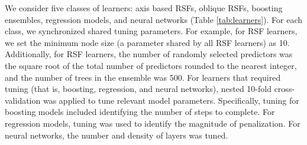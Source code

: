 \documentclass[twoside,11pt]{article}\usepackage[]{graphicx}\usepackage[]{xcolor}
\newcommand{\ie}{that is}
\newcommand{\tabref}[1]{Table \ref{#1}}
\begin{document}
We consider five classes of learners: axis based RSFs, oblique RSFs, boosting ensembles, regression models, and neural networks (\tabref{tab:learners}). For each class, we synchronized shared tuning parameters. For example, for RSF learners, we set the minimum node size (a parameter shared by all RSF learners) as 10. Additionally, for RSF learners, the number of randomly selected predictors was the square root of the total number of predictors rounded to the nearest integer, and the number of trees in the ensemble was 500. For learners that required tuning (\ie, boosting, regression, and neural networks), nested 10-fold cross-validation was applied to tune relevant model parameters. Specifically, tuning for boosting models included identifying the number of steps to complete. For regression models, tuning was used to identify the magnitude of penalization. For neural networks, the number and density of layers was tuned.
\end{document}
